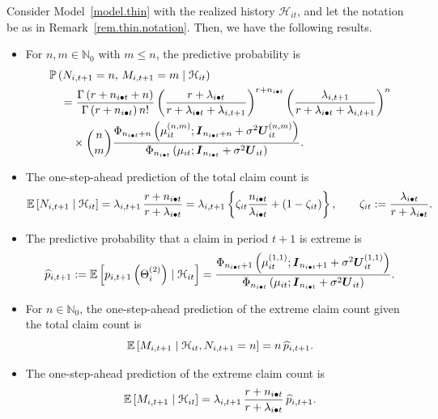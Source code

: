 \begin{theorem}
\label{thm.thin.pred}
Consider Model~\ref{model.thin} with the realized history
\(\mathcal H_{it}\), and let the notation be as in
Remark~\ref{rem.thin.notation}. Then, we have the following results.
\begin{itemize}
  \item[i.] For \(n,m\in\mathbb N_0\) with \(m\le n\), the predictive
  probability is
  \[
  \begin{aligned}
  &\P{N_{i,t+1}=n,\,M_{i,t+1}=m\mid\mathcal H_{it}}\\
  &\quad=
  \frac{\Gamma\left(r+n_{i\bullet t}+n\right)}
  {\Gamma\left(r+n_{i\bullet t}\right)n!}
  \left(
  \frac{r+\lambda_{i\bullet t}}{r+\lambda_{i\bullet t}+\lambda_{i,t+1}}
  \right)^{r+n_{i\bullet t}}
  \left(
  \frac{\lambda_{i,t+1}}{r+\lambda_{i\bullet t}+\lambda_{i,t+1}}
  \right)^{n}\\
  &\qquad\times
  \binom{n}{m}
  \frac{
  \Phi_{n_{i\bullet t}+n}
  \left(
  \mu_{it}^{(n,m)};
  \boldsymbol I_{n_{i\bullet t}+n}+\sigma^2\boldsymbol U_{it}^{(n,m)}
  \right)
  }{
  \Phi_{n_{i\bullet t}}
  \left(
  \mu_{it};
  \boldsymbol I_{n_{i\bullet t}}+\sigma^2\boldsymbol U_{it}
  \right)
  }.
  \end{aligned}
  \]

  \item[ii.] The one-step-ahead prediction of the total claim count is
  \[
  \E{N_{i,t+1}\mid\mathcal H_{it}}
  =
  \lambda_{i,t+1}\,
  \frac{r+n_{i\bullet t}}{r+\lambda_{i\bullet t}}
  =
  \lambda_{i,t+1}
  \left\{
  \zeta_{it}\frac{n_{i\bullet t}}{\lambda_{i\bullet t}}
  +
  \left(1-\zeta_{it}\right)
  \right\},
  \qquad
  \zeta_{it}:=\frac{\lambda_{i\bullet t}}{r+\lambda_{i\bullet t}}.
  \]

  \item[iii.] The predictive probability that a claim in period
  \(t+1\) is extreme is
  \[
  \widehat p_{i,t+1}
  :=
  \E{p_{i,t+1}\left(\Theta_i^{(2)}\right)\mid\mathcal H_{it}}
  =
  \frac{
  \Phi_{n_{i\bullet t}+1}
  \left(
  \mu_{it}^{(1,1)};
  \boldsymbol I_{n_{i\bullet t}+1}+\sigma^2\boldsymbol U_{it}^{(1,1)}
  \right)
  }{
  \Phi_{n_{i\bullet t}}
  \left(
  \mu_{it};
  \boldsymbol I_{n_{i\bullet t}}+\sigma^2\boldsymbol U_{it}
  \right)
  }.
  \]

  \item[iv.] For \(n\in\mathbb N_0\), the one-step-ahead prediction of
  the extreme claim count given the total claim count is
  \[
  \E{M_{i,t+1}\mid\mathcal H_{it},N_{i,t+1}=n}
  =
  n\,\widehat p_{i,t+1}.
  \]

  \item[v.] The one-step-ahead prediction of the extreme claim count is
  \[
  \E{M_{i,t+1}\mid\mathcal H_{it}}
  =
  \lambda_{i,t+1}\,
  \frac{r+n_{i\bullet t}}{r+\lambda_{i\bullet t}}\,
  \widehat p_{i,t+1}.
  \]
\end{itemize}
\end{theorem}

